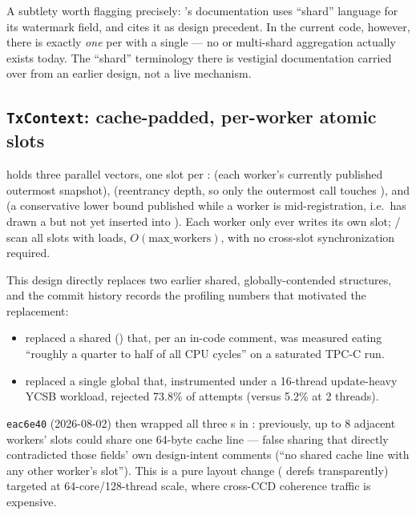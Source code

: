 \documentclass[11pt]{article}
\newcommand{\commit}[1]{\texttt{#1}}
\begin{document}
A subtlety worth flagging precisely: 's documentation uses
``shard'' language for its  watermark field, and 
cites it as design precedent. In the current code, however, there is exactly \emph{one}
 per  with a single 
--- no  or multi-shard aggregation actually exists today. The
``shard'' terminology there is vestigial documentation carried over from an earlier
design, not a live mechanism.

\subsection{\texttt{TxContext}: cache-padded, per-worker atomic slots}

 holds three parallel vectors, one slot per
:  (each worker's currently published outermost snapshot),
 (reentrancy depth, so only the outermost  call
touches ), and  (a conservative lower bound published
while a worker is mid-registration, i.e.\ has drawn a  but not yet
inserted into ). Each worker only ever writes its own slot;
/ scan all slots with  loads,
$O(\mathrm{max\_workers})$, with no cross-slot synchronization required.

This design directly replaces two earlier shared, globally-contended structures, and the
commit history records the profiling numbers that motivated the replacement:

\begin{itemize}
  \item {} replaced a shared 
        () that, per an in-code comment, was measured eating
        ``roughly a quarter to half of all CPU cycles'' on a saturated TPC-C run.
  \item {} replaced a single global
         that, instrumented under a
        16-thread update-heavy YCSB workload, rejected 73.8\% of 
        attempts (versus 5.2\% at 2 threads).
\end{itemize}

\commit{eac6e40} (2026-08-02) then wrapped all three s in
: previously, up to 8 adjacent workers' slots could
share one 64-byte cache line --- false sharing that directly contradicted those fields'
own design-intent comments (``no shared cache line with any other worker's slot''). This
is a pure layout change ( derefs transparently) targeted at
64-core/128-thread scale, where cross-CCD coherence traffic is expensive.
\end{document}
